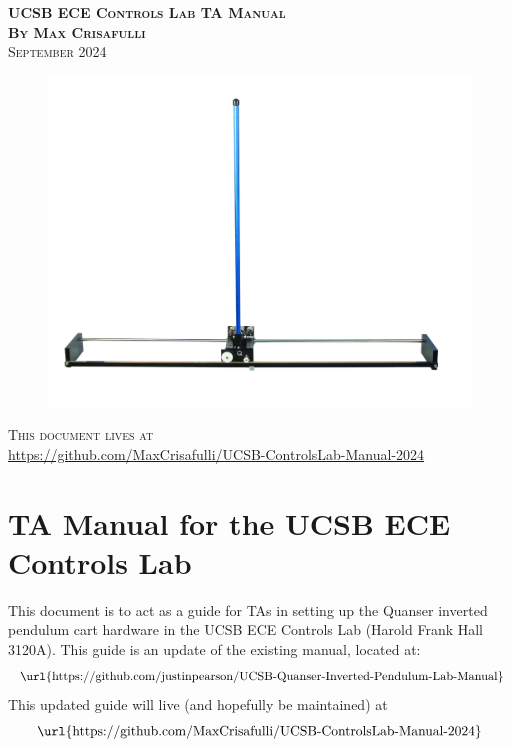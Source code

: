 \documentclass[11pt,letterpaper]{article}
\begin{document}
\begin{center}
  \Huge{\textsc{\textbf{UCSB ECE Controls Lab TA Manual}}}
  \vspace{0.5cm}
  \\ \textbf{\textsc{By} \large{\textsc{Max Crisafulli}}}
  \vspace{0.2cm}
  \\ \textsc{September 2024}

  \vspace{\fill}

\begin{figure}[H]
    \centering
    \includegraphics[width=1\textwidth]{./Figures/IP02-Inverted-Pendulum_graphics.jpg}
\end{figure}

\vspace{\fill}


\textsc{This document lives at} \\
\url{https://github.com/MaxCrisafulli/UCSB-ControlsLab-Manual-2024}
\end{center}
\thispagestyle{empty}

\newpage
\phantom{}
\thispagestyle{empty}
\newpage
\setcounter{page}{1}


\section{TA Manual for the UCSB ECE Controls Lab}
This document is to act as a guide for TAs in setting up the Quanser inverted pendulum cart hardware in the UCSB ECE Controls Lab (Harold Frank Hall 3120A). This guide is an update of the existing manual, located at:
\[ \text{ \url{https://github.com/justinpearson/UCSB-Quanser-Inverted-Pendulum-Lab-Manual}}\]
This updated guide will live (and hopefully be maintained) at 
\[\text{\url{https://github.com/MaxCrisafulli/UCSB-ControlsLab-Manual-2024}}\]
\end{document}
